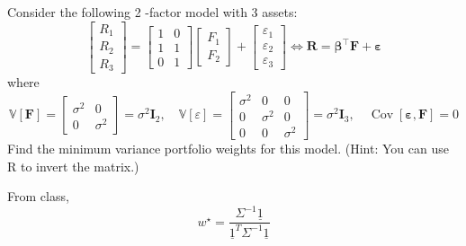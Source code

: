 \documentclass[
  oneside]{book}
\begin{document}
Consider the following 2 -factor model with 3 assets:
\[
\left[\begin{array}{l}
R_1 \\
R_2 \\
R_3
\end{array}\right]=\left[\begin{array}{ll}
1 & 0 \\
1 & 1 \\
0 & 1
\end{array}\right]\left[\begin{array}{l}
F_1 \\
F_2
\end{array}\right]+\left[\begin{array}{l}
\varepsilon_1 \\
\varepsilon_2 \\
\varepsilon_3
\end{array}\right] \Leftrightarrow \boldsymbol{R}=\boldsymbol{\beta}^{\top} \boldsymbol{F}+\boldsymbol{\varepsilon}
\]
where
\[
\mathbb{V}[\boldsymbol{F}]=\left[\begin{array}{cc}
\sigma^2 & 0 \\
0 & \sigma^2
\end{array}\right]=\sigma^2 \boldsymbol{I}_2, \quad \mathbb{V}[\varepsilon]=\left[\begin{array}{ccc}
\sigma^2 & 0 & 0 \\
0 & \sigma^2 & 0 \\
0 & 0 & \sigma^2
\end{array}\right]=\sigma^2 \boldsymbol{I}_3, \quad \operatorname{Cov}[\boldsymbol{\varepsilon}, \boldsymbol{F}]=0
\]
Find the minimum variance portfolio weights for this model. (Hint: You can use \(\mathrm{R}\) to invert the matrix.)

From class,
\[
w^{\star} = \frac{\Sigma ^{-1} \underline{1}}{\underline{1}^{T}\Sigma^{-1}  \underline{1}}
\]
\end{document}
